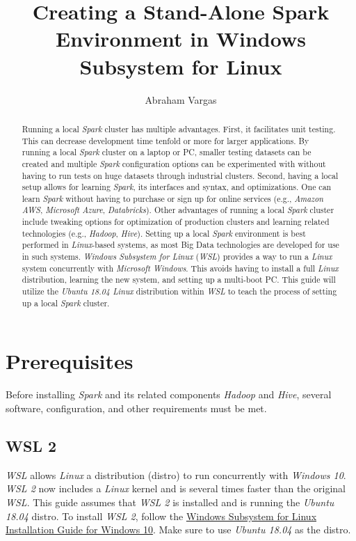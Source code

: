 \documentclass{article}
\begin{document}
\title{Creating a Stand-Alone Spark Environment in Windows Subsystem for Linux}
\author{Abraham Vargas}
\maketitle

\begin{abstract}
Running a local \emph{Spark} cluster has multiple advantages. First, it facilitates unit testing.
This can decrease development time tenfold or more for larger applications. By running a
local \emph{Spark} cluster on a laptop or PC, smaller testing datasets can be created and multiple
\emph{Spark} configuration options can be experimented with without having to run tests on huge
datasets through industrial clusters. Second, having a local setup allows for learning
\emph{Spark}, its interfaces and syntax, and optimizations. One can learn \emph{Spark} without
having to purchase or sign up for online services (e.g., \emph{Amazon AWS}, \emph{Microsoft Azure},
\emph{Databricks}). Other advantages of running a local \emph{Spark} cluster include tweaking
options for optimization of production clusters and learning related technologies (e.g.,
\emph{Hadoop}, \emph{Hive}). Setting up a local \emph{Spark} environment is best performed in
\emph{Linux}-based systems, as most Big Data technologies are developed for use in such systems.
\emph{Windows Subsystem for Linux} (\emph{WSL}) provides a way to run a \emph{Linux} system
concurrently with \emph{Microsoft Windows}. This avoids having to install a full \emph{Linux}
distribution, learning the new system, and setting up a multi-boot PC. This guide will utilize
the \emph{Ubuntu 18.04 Linux} distribution within \emph{WSL} to teach the process of setting up a
local \emph{Spark} cluster.
\end{abstract}

\newpage
\tableofcontents
\newpage

\section{Prerequisites}
Before installing \emph{Spark} and its related components \emph{Hadoop} and \emph{Hive}, several
software, configuration, and other requirements must be met.

  \subsection{WSL 2}
  \emph{WSL} allows \emph{Linux} a distribution (distro) to run concurrently with \emph{Windows 10}.
  \emph{WSL 2} now includes a \emph{Linux} kernel and is several times faster than the original
  \emph{WSL}. This guide assumes that \emph{WSL 2} is installed and is running the
  \emph{Ubuntu 18.04} distro. To install \emph{WSL 2}, follow the
  \href{https://docs.microsoft.com/en-us/windows/wsl/install-win10}{Windows Subsystem
  for Linux Installation Guide for Windows 10}. Make sure to use \emph{Ubuntu 18.04} as the distro.
\end{document}
